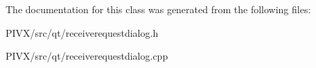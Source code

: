 The documentation for this class was generated from the following files\+:\begin{DoxyCompactItemize}
\item 
P\+I\+V\+X/src/qt/receiverequestdialog.\+h\item 
P\+I\+V\+X/src/qt/receiverequestdialog.\+cpp\end{DoxyCompactItemize}
